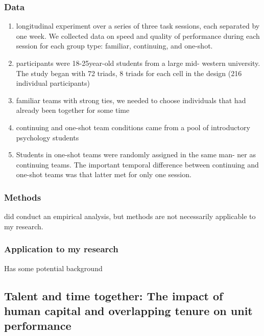 \documentclass[12pt]{article}
\begin{document}
\subsubsection*{Data}
\begin{enumerate}
    \item longitudinal experiment over a series of three task sessions, each separated by one week. We collected data on speed and quality of performance during each session for each group type: familiar, continuing, and one-shot.
    \item participants were 18-25year-old students from a large mid- western university. The study began with 72 triads, 8 triads for each cell in the design (216 individual participants)
    \item  familiar teams with strong ties, we needed to choose individuals that had already been together for some time
    \item continuing and one-shot team conditions came from a pool of introductory psychology students
    \item Students in one-shot teams were randomly assigned in the same man- ner as continuing teams. The important temporal difference between continuing and one-shot teams was that latter met for only one session.
\end{enumerate}

\subsubsection*{Methods}

did conduct an empirical analysis, but methods are not necessarily applicable to my research. 

\subsubsection*{Application to my research}

Has some potential background



\subsection*{Talent and time together: The impact of human capital and overlapping tenure on unit performance\cite{talent_and_time}}
\end{document}
